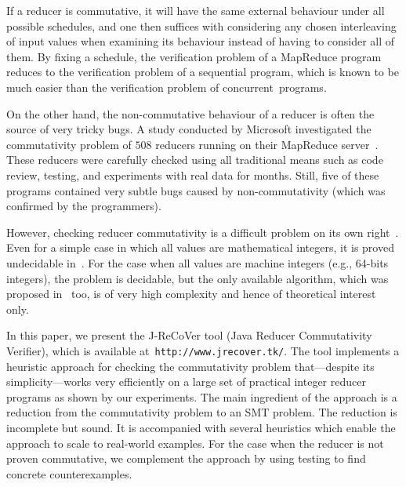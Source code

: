\documentclass{llncs}
\begin{document}
If a reducer is commutative, it will have the same external behaviour under all
possible schedules, and one then suffices with considering any chosen
interleaving of input values when examining its behaviour instead of having to
consider all of them. By fixing a schedule, the verification problem of a
MapReduce program reduces to the verification problem of a sequential program,
which is known to be much easier than the verification problem of
concurrent~programs.


On the other hand, the non-commutative behaviour of a reducer is often the source
of very tricky bugs. A study conducted by Microsoft investigated the
commutativity problem of $508$ reducers running on their MapReduce
server~\cite{xiao14mr}. These reducers were carefully checked using all
traditional means such as code review, testing, and experiments with real data
for months. Still, five of these programs contained very subtle bugs caused by
non-commutativity (which was confirmed by the programmers).

However, checking reducer commutativity is a difficult problem on its own
right~\cite{ChenHSW15,ChenSW16,ChenLTW17}. Even for a simple case in which all
values are mathematical integers, it is proved undecidable in~\cite{ChenHSW15}.
For the case when all values are machine integers (e.g., 64-bits integers), the
problem is decidable, but the only available algorithm, which was proposed
in~\cite{ChenHSW15} too, is of very high complexity and hence of theoretical
interest only.

In this paper, we present the J-ReCoVer tool (Java Reducer Commutativity
Verifier), which is available at~\verb|http://www.jrecover.tk/|.
%
%
The tool implements a heuristic approach for checking the commutativity problem
that---despite its simplicity---works very efficiently on a large set of
practical integer reducer programs as shown by our experiments. The main
ingredient of the approach is a reduction from the commutativity problem to an
SMT problem. The reduction is incomplete but sound. It is accompanied with
several heuristics which enable the approach to scale to real-world examples.
For the case when the reducer is not proven commutative, we complement the
approach by using testing to find concrete counterexamples.
\end{document}
